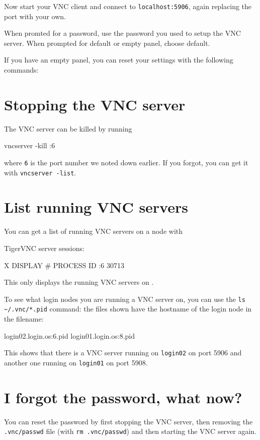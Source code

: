 Now start your VNC client and connect to \lstinline|localhost:5906|, again replacing
the port with your own.

When promted for a password, use the password you used to setup the VNC server.
When prompted for default or empty panel, choose default.

If you have an empty panel, you can reset your settings with the following commands:

\begin{prompt}
\end{prompt}

\section{Stopping the VNC server}

The VNC server can be killed by running

\begin{prompt}
vncserver -kill :6
\end{prompt}

where \lstinline|6| is the port number we noted down earlier. If you forgot,
you can get it with \lstinline|vncserver -list|.

\section{List running VNC servers}

You can get a list of running VNC servers on a node with

\begin{prompt}
TigerVNC server sessions:

X DISPLAY #	PROCESS ID
:6		    30713
\end{prompt}

This only displays the running VNC servers on .

To see what login nodes you are running a VNC server on, you can use the \lstinline|ls ~/.vnc/*.pid|
command: the files shown have the hostname of the login node in the filename:

\begin{prompt}
login02.login.os:6.pid
login01.login.os:8.pid
\end{prompt}

This shows that there is a VNC server running on \lstinline|login02| on port 5906
and another one running on \lstinline|login01| on port 5908.

\section{I forgot the password, what now?}

You can reset the password by first stopping the VNC server, then removing
the \lstinline|.vnc/passwd| file (with \lstinline|rm .vnc/passwd|) and then
starting the VNC server again.
